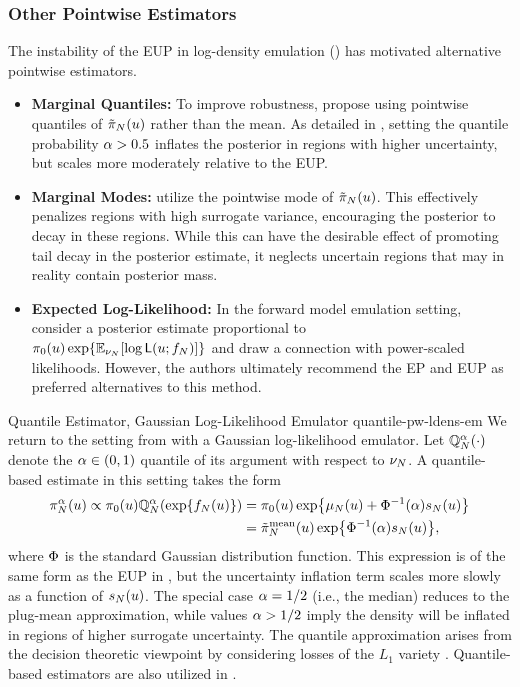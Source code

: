 \documentclass[12pt]{article}
\begin{document}
 
\subsubsection{Other Pointwise Estimators}
The instability of the EUP in log-density emulation () has motivated alternative pointwise estimators.
\begin{itemize}
    \item \textbf{Marginal Quantiles:} To improve robustness, \citet{VehtariParallelGP} propose using pointwise quantiles of 
    ${\tilde{\pi}}_{N}(u)$ rather than the mean. As detailed in , setting the quantile probability 
    $\alpha > 0.5$ inflates the posterior in regions with higher uncertainty, but scales more moderately relative to the EUP.
    \item \textbf{Marginal Modes:} \citet{gpEmMCMC} utilize the pointwise mode of ${\tilde{\pi}}_{N}(u)$. This effectively penalizes 
    regions with high surrogate variance, encouraging the posterior to decay in these regions. While this can have the desirable
    effect of promoting tail decay in the posterior estimate, it neglects uncertain regions that may in reality contain posterior mass.
    \item \textbf{Expected Log-Likelihood:} In the forward model emulation setting, \citet{BurknerSurrogate} consider a
    posterior estimate proportional to \\ $\pi_0(u) \exp\mathopen{}\left\{\mathbb{E}_{\nu_{N}}[\log \mathsf{L}(u; f_{N})]\right\}\mathclose{}$ and draw 
    a connection with power-scaled likelihoods. However, the authors ultimately recommend the EP and EUP as preferred 
    alternatives to this method.
\end{itemize}

\begin{examplebox}
{Quantile Estimator, Gaussian Log-Likelihood Emulator}
{quantile-pw-ldens-em}
We return to the setting from  with a Gaussian log-likelihood emulator. 
Let $\mathbb{Q}^\alpha_{N}(\cdot)$ denote the $\alpha \in (0, 1)$ quantile of its argument with respect to $\nu_{N}$. 
A quantile-based estimate in this setting takes the form
\begin{align*}
{\pi}_{N}^{\alpha}(u) \propto
\pi_0(u) \mathbb{Q}^\alpha_{N}(\exp\mathopen{}\left\{f_{N}(u)\right\}\mathclose{})
&= \pi_0(u) \exp\mathopen{}\left\{\mu_{N}(u) + \Phi^{-1}(\alpha) s_{N}(u)\right\}\mathclose{} \\
&= {\tilde{\pi}}_{N}^{\mathrm{mean}}(u) \exp\mathopen{}\left\{\Phi^{-1}(\alpha) s_{N}(u)\right\}\mathclose{},
\end{align*}
where $\Phi$ is the standard Gaussian distribution function. This expression is of the same form 
as the EUP in , but the uncertainty inflation term scales more slowly as a function
of $s_{N}(u)$. The special case $\alpha = 1/2$ (i.e., the median) 
reduces to the plug-mean approximation, while values $\alpha > 1/2$ imply 
the density will be inflated in regions of higher surrogate uncertainty. The quantile approximation
arises from the decision theoretic viewpoint by considering losses of the $L_1$ variety
\citep{VehtariParallelGP,gpEmMCMC}. Quantile-based estimators are also utilized in
\citet{quantileApprox,FATES_CES}.
\end{examplebox}
\end{document}
